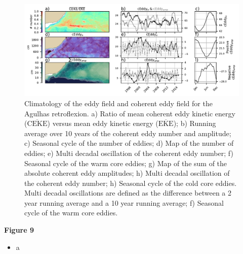\documentclass[draft,linenumbers]{agujournal2019}
\newcommand{\MEKE}{\overline{\textrm{EKE}}}
\newcommand{\MCEKE}{\overline{\textrm{CEKE}}}
\begin{document}
	\begin{figure}
	    \centering
	    \includegraphics[width=1\textwidth]{figures/regional_ratios_and_stats_V2_2.pdf}
	    \caption{Climatology of the eddy field and coherent eddy field for the Agulhas retroflexion. a) Ratio of mean coherent eddy kinetic energy ($\MCEKE$) versus mean eddy kinetic energy ($\MEKE$); b) Running average over 10 years of the coherent eddy number and amplitude; c) Seasonal cycle of the number of eddies; d) Map of the number of eddies; 
		e) Multi decadal oscillation of the coherent eddy number; f) Seasonal cycle of the warm core eddies; g) Map of the sum of the absolute coherent eddy amplitudes;  h) Multi decadal oscillation of the coherent eddy number; h) Seasonal cycle of the cold core eddies. Multi decadal oscillations are defined as the difference between a 2 year running average and a 10 year running average; f) Seasonal cycle of the warm core eddies.}
	    \label{fig:south_atlantic_cycle}
	\end{figure}

	\textbf{Figure 9}
	\begin{itemize}
		\item a
	\end{itemize}
\end{document}
